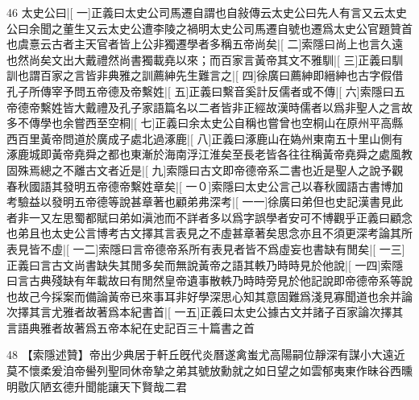 46
太史公曰|[%
一]正義曰太史公司馬遷自謂也自敍傳云太史公曰先人有言又云太史公曰余聞之董生又云太史公遭李陵之禍明太史公司馬遷自號也遷爲太史公官題贊首也虞憙云古者主天官者皆上公非獨遷學者多稱五帝尚矣|[%
二]索隱曰尚上也言久遠也然尚矣文出大戴禮然尚書獨載堯以來；而百家言黃帝其文不雅馴|[%
三]正義曰馴訓也謂百家之言皆非典雅之訓薦紳先生難言之|[%
四]徐廣曰薦紳即縉紳也古字假借孔子所傳宰予問五帝德及帝繫姓|[%
五]正義曰繫音奚計反儒者或不傳|[%
六]索隱曰五帝德帝繫姓皆大戴禮及孔子家語篇名以二者皆非正經故漢時儒者以爲非聖人之言故多不傳學也余嘗西至空桐|[%
七]正義曰余太史公自稱也嘗曾也空桐山在原州平高縣西百里黃帝問道於廣成子處北過涿鹿|[%
八]正義曰涿鹿山在媯州東南五十里山側有涿鹿城即黃帝堯舜之都也東漸於海南浮江淮矣至長老皆各往往稱黃帝堯舜之處風教固殊焉總之不離古文者近是|[%
九]索隱曰古文即帝德帝系二書也近是聖人之說予觀春秋國語其發明五帝德帝繫姓章矣|[%
一０]索隱曰太史公言己以春秋國語古書博加考驗益以發明五帝德等說甚章著也顧弟弗深考|[%
一一]徐廣曰弟但也史記漢書見此者非一又左思蜀都賦曰弟如滇池而不詳者多以爲字誤學者安可不博觀乎正義曰顧念也弟且也太史公言博考古文擇其言表見之不虛甚章著矣思念亦且不須更深考論其所表見皆不虛|[%
一二]索隱曰言帝德帝系所有表見者皆不爲虛妄也書缺有閒矣|[%
一三]正義曰言古文尚書缺失其閒多矣而無說黃帝之語其軼乃時時見於他說|[%
一四]索隱曰言古典殘缺有年載故曰有閒然皇帝遺事散軼乃時時旁見於他記說即帝德帝系等說也故己今採案而備論黃帝已來事耳非好學深思心知其意固難爲淺見寡聞道也余并論次擇其言尤雅者故著爲本紀書首|[%
一五]正義曰太史公據古文并諸子百家論次擇其言語典雅者故著爲五帝本紀在史記百三十篇書之首

48
【索隱述贊】帝出少典居于軒丘旣代炎曆遂禽蚩尤高陽嗣位靜深有謀小大遠近莫不懷柔爰洎帝嚳列聖同休帝摯之弟其號放勳就之如日望之如雲郁夷東作昧谷西曛明敭庂陋玄德升聞能讓天下賢哉二君
